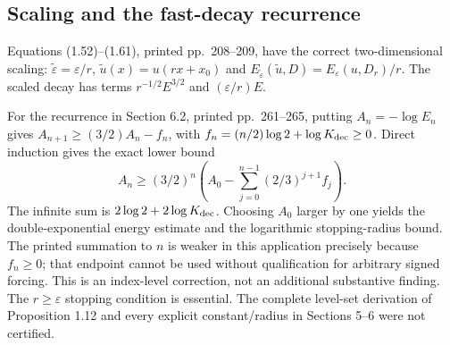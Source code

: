\documentclass[10pt]{article}
\begin{document}
\subsection*{Scaling and the fast-decay recurrence}
Equations (1.52)–(1.61), printed pp. 208–209, have the correct two-dimensional scaling: \(\widetilde\varepsilon=\varepsilon/r\), \(\widetilde u(x)=u(rx+x_0)\) and \(E_{\widetilde\varepsilon}(\widetilde u,D)=E_\varepsilon(u,D_r)/r\). The scaled decay has terms \(r^{-1/2}E^{3/2}\) and \((\varepsilon/r)E\).\par
For the recurrence in Section 6.2, printed pp. 261–265, putting \(A_n=-\log E_n\) gives \(A_{n+1}\ge(3/2)A_n-f_n\), with \(f_n=(n/2)\log2+\log K_{\rm dec}\ge0\). Direct induction gives the exact lower bound \[A_n\ge(3/2)^n\left(A_0-\sum_{j=0}^{n-1}(2/3)^{j+1}f_j\right).\] The infinite sum is \(2\log2+2\log K_{\rm dec}\). Choosing \(A_0\) larger by one yields the double-exponential energy estimate and the logarithmic stopping-radius bound. The printed summation to \(n\) is weaker in this application precisely because \(f_n\ge0\); that endpoint cannot be used without qualification for arbitrary signed forcing. This is an index-level correction, not an additional substantive finding. The \(r\ge\varepsilon\) stopping condition is essential. The complete level-set derivation of Proposition 1.12 and every explicit constant/radius in Sections 5–6 were not certified.\par
\end{document}
